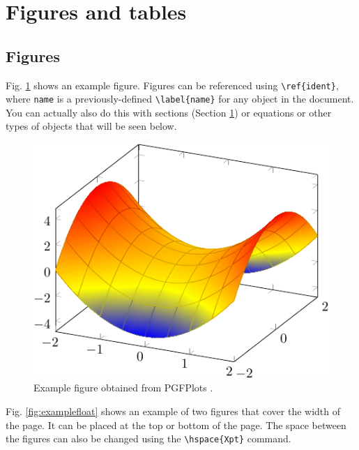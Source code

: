\documentclass[9pt,a4paper,twoside]{tau-class/tau}
\begin{document}
\section{Figures and tables} \label{sec:table}

    \subsection{Figures}
		
	Fig. \ref{fig:figure} shows an example figure. Figures can be referenced using \verb|\ref{ident}|, where \texttt{name} is a previously-defined \verb|\label{name}| for any object in the document. You can actually also do this with sections (Section \ref{sec:table}) or equations or other types of objects that will be seen below.
		
	\begin{figure}[H]
		\centering
		\includegraphics[width=0.75\columnwidth]{figures/Example}
		\caption{Example figure obtained from PGFPlots \cite{PFGPlots}.}
		\label{fig:figure}
	\end{figure}
		
        Fig. \ref{fig:examplefloat} shows an example of two figures that cover the width of the page. It can be placed at the top or bottom of the page. The space between the figures can also be changed using the \verb|\hspace{Xpt}| command.
		
\end{document}
